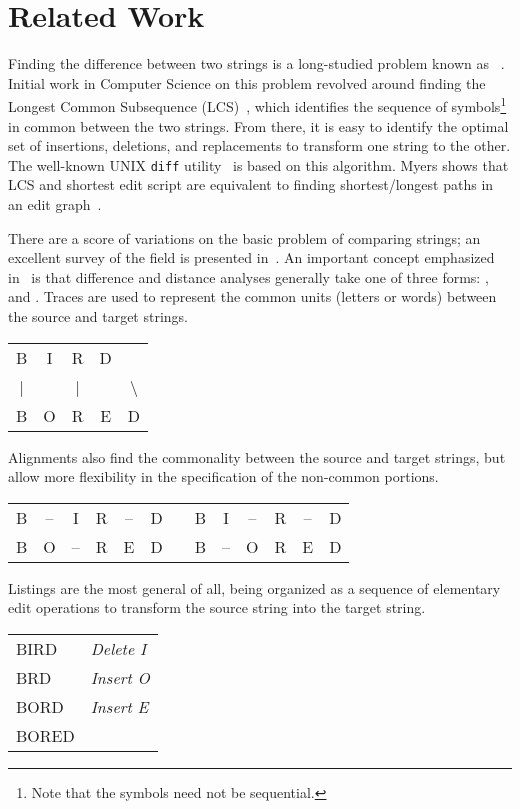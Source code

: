 \section{Related Work}
\label{sec:diff-related}

Finding the difference between two strings is a long-studied problem
known as ~\cite{Wagner1974}.
Initial work in Computer Science on this problem revolved around finding the
Longest Common Subsequence (LCS)~\cite{Gusfield1999}, which identifies the
sequence of symbols\footnote{Note that the symbols need not be sequential.}
in common between the two strings.
From there, it is easy to identify the optimal
set of insertions, deletions, and replacements to transform
one string to the other.
The well-known UNIX \texttt{diff} utility~\cite{Hunt1976} is based
on this algorithm.
Myers shows that LCS and shortest edit script are equivalent to finding
shortest/longest paths in an edit graph~\cite{Myers1986}.

There are a score of variations on the basic problem of
comparing strings; an excellent survey of the field is
presented in~\cite{Sankoff1999}.
An important concept emphasized in~\cite{Sankoff1999} is that
difference and distance analyses generally take one of
three forms: ,  and .
Traces are used to represent the common units (\eg letters or words)
between the source and target strings.
\begin{center}
  \begin{tabular}{c c c c c}
B & I & R & D & \\
| &   & | &   & $\!\!\!\!\!\!\!\!\!\!$\textbackslash \\
B & O & R & E & D \\
  \end{tabular}
\end{center}
Alignments also find the commonality between the source and target
strings, but allow more flexibility in the specification of
the non-common portions.
\begin{center}
  \begin{tabular}{c c c c c c c c c c c c c}
B & -- & I & R & -- & D & \qquad\qquad & B & I & -- & R & -- & D \\
B & O & -- & R & E & D & \qquad\qquad  & B & -- & O & R & E & D \\
  \end{tabular}
\end{center}
Listings are the most general of all, being
organized as a sequence of elementary edit operations
to transform the source string into the target string.
\begin{center}
  \begin{tabular}{l l}
  BIRD & \textit{Delete I} \\
  BRD & \textit{Insert O} \\
  BORD & \textit{Insert E} \\
  BORED & \\
  \end{tabular}
\end{center}

